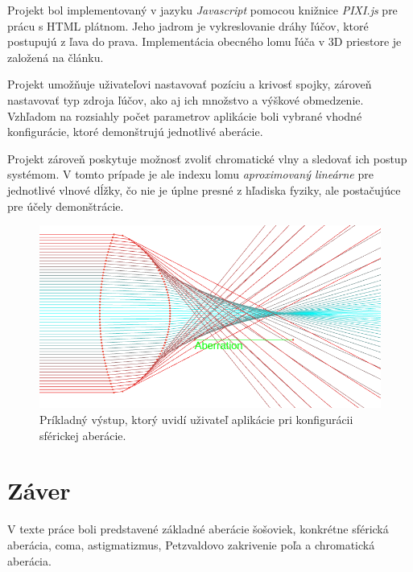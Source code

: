 Projekt bol implementovaný v jazyku \textit{Javascript} pomocou knižnice \textit{PIXI.js} pre prácu
s HTML plátnom. Jeho jadrom je vykreslovanie dráhy ľúčov, ktoré postupujú z ľava do prava. 
Implementácia obecného lomu ľúča v 3D priestore je založená na článku\cite{refractionAlgorithm}.

Projekt umožňuje uživateľovi nastavovať pozíciu a krivosť spojky, zároveň nastavovať typ zdroja 
ľúčov, ako aj ich množstvo a výškové obmedzenie. Vzhľadom na rozsiahly počet parametrov aplikácie
boli vybrané vhodné konfigurácie, ktoré demonštrujú jednotlivé aberácie.

Projekt zároveň poskytuje možnosť zvoliť chromatické vlny a sledovať ich postup systémom. V tomto
prípade je ale indexu lomu \textit{aproximovaný lineárne} pre jednotlivé vlnové dĺžky, čo nie je
úplne presné z hľadiska fyziky, ale postačujúce pre účely demonštrácie.

\begin{figure}
\includegraphics[scale=0.4]{obrazky-figures/application.png}
    \centering \caption{Príkladný výstup, ktorý uvidí uživateľ aplikácie pri konfigurácii sférickej aberácie.}
\end{figure}

\section{Záver}
V texte práce boli predstavené základné aberácie šošoviek, konkrétne sférická aberácia, coma,
astigmatizmus, Petzvaldovo zakrivenie poľa a chromatická aberácia.




